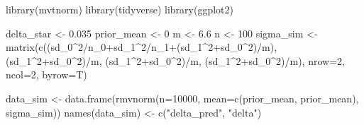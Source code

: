 \documentclass[
]{book}
\newenvironment{Shaded}{\begin{snugshade}}{\end{snugshade}}
\newcommand{\AttributeTok}[1]{\textcolor[rgb]{0.77,0.63,0.00}{#1}}
\newcommand{\DecValTok}[1]{\textcolor[rgb]{0.00,0.00,0.81}{#1}}
\newcommand{\FloatTok}[1]{\textcolor[rgb]{0.00,0.00,0.81}{#1}}
\newcommand{\FunctionTok}[1]{\textcolor[rgb]{0.00,0.00,0.00}{#1}}
\newcommand{\NormalTok}[1]{#1}
\newcommand{\OtherTok}[1]{\textcolor[rgb]{0.56,0.35,0.01}{#1}}
\newcommand{\SpecialCharTok}[1]{\textcolor[rgb]{0.00,0.00,0.00}{#1}}
\newcommand{\StringTok}[1]{\textcolor[rgb]{0.31,0.60,0.02}{#1}}
\begin{document}
\begin{Shaded}
\begin{Highlighting}[]
\FunctionTok{library}\NormalTok{(mvtnorm)}
\FunctionTok{library}\NormalTok{(tidyverse)}
\FunctionTok{library}\NormalTok{(ggplot2)}

\NormalTok{delta\_star }\OtherTok{\textless{}{-}} \FloatTok{0.035}
\NormalTok{prior\_mean }\OtherTok{\textless{}{-}} \DecValTok{0}
\NormalTok{m }\OtherTok{\textless{}{-}} \FloatTok{6.6}
\NormalTok{n }\OtherTok{\textless{}{-}} \DecValTok{100}
\NormalTok{sigma\_sim }\OtherTok{\textless{}{-}} \FunctionTok{matrix}\NormalTok{(}\FunctionTok{c}\NormalTok{((sd\_0}\SpecialCharTok{\^{}}\DecValTok{2}\SpecialCharTok{/}\NormalTok{n\_0}\SpecialCharTok{+}\NormalTok{sd\_1}\SpecialCharTok{\^{}}\DecValTok{2}\SpecialCharTok{/}\NormalTok{n\_1}\SpecialCharTok{+}\NormalTok{(sd\_1}\SpecialCharTok{\^{}}\DecValTok{2}\SpecialCharTok{+}\NormalTok{sd\_0}\SpecialCharTok{\^{}}\DecValTok{2}\NormalTok{)}\SpecialCharTok{/}\NormalTok{m), (sd\_1}\SpecialCharTok{\^{}}\DecValTok{2}\SpecialCharTok{+}\NormalTok{sd\_0}\SpecialCharTok{\^{}}\DecValTok{2}\NormalTok{)}\SpecialCharTok{/}\NormalTok{m, (sd\_1}\SpecialCharTok{\^{}}\DecValTok{2}\SpecialCharTok{+}\NormalTok{sd\_0}\SpecialCharTok{\^{}}\DecValTok{2}\NormalTok{)}\SpecialCharTok{/}\NormalTok{m, (sd\_1}\SpecialCharTok{\^{}}\DecValTok{2}\SpecialCharTok{+}\NormalTok{sd\_0}\SpecialCharTok{\^{}}\DecValTok{2}\NormalTok{)}\SpecialCharTok{/}\NormalTok{m), }\AttributeTok{nrow=}\DecValTok{2}\NormalTok{, }\AttributeTok{ncol=}\DecValTok{2}\NormalTok{, }\AttributeTok{byrow=}\NormalTok{T)}

\NormalTok{data\_sim }\OtherTok{\textless{}{-}} \FunctionTok{data.frame}\NormalTok{(}\FunctionTok{rmvnorm}\NormalTok{(}\AttributeTok{n=}\DecValTok{10000}\NormalTok{, }\AttributeTok{mean=}\FunctionTok{c}\NormalTok{(prior\_mean, prior\_mean), sigma\_sim))}
\FunctionTok{names}\NormalTok{(data\_sim) }\OtherTok{\textless{}{-}} \FunctionTok{c}\NormalTok{(}\StringTok{"delta\_pred"}\NormalTok{, }\StringTok{"delta"}\NormalTok{)}


\end{Highlighting}
\end{Shaded}
\end{document}
